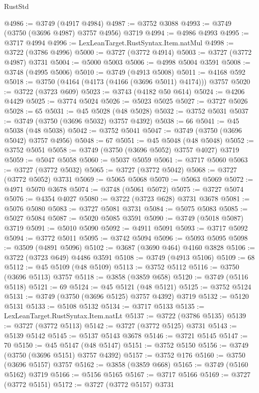 \begin{lexlean}{RustStd}
\begin{coremodule}
@4986 := @3749 (@4917 @4984)
@4987 := @3752 @3088
@4993 := @3749 (@3750 (@3696 @4987) @3757 @4956) @3719
@4994 := @4986 @4993
@4995 := @3717 @4994
@4996 := LexLeanTarget.RustSyntax.Item.natMul
@4998 := @3722 (@3786 @4996)
@5000 := @3727 (@3772 @4914)
@5003 := @3727 (@3772 @4987) @3731
@5004 := @5000 @5003
@5006 := @4998 @5004 @3591
@5008 := @3748 (@4995 @5006)
@5010 := @3749 (@4913 @5008)
@5011 := @4168 @592
@5018 := @3750 (@4164 (@4173 (@4166 (@3696 @5011) @4174))) @3757
@5020 := @3722 (@3723 @609)
@5023 := @3743 (@4182 @50 @614)
@5024 := @4206 @4429
@5025 := @3774 @5024
@5026 := @5023 @5025
@5027 := @3727 @5026
@5028 := 65
@5031 := @45 @5028 (@48 @5028)
@5032 := @3752 @5031
@5037 := @3749 (@3750 (@3696 @5032) @3757 @4392)
@5038 := 66
@5041 := @45 @5038 (@48 @5038)
@5042 := @3752 @5041
@5047 := @3749 (@3750 (@3696 @5042) @3757 @4956)
@5048 := 67
@5051 := @45 @5048 (@48 @5048)
@5052 := @3752 @5051
@5058 := @3749 (@3750 (@3696 @5052) @3757 @4027) @3719
@5059 := @5047 @5058
@5060 := @5037 @5059
@5061 := @3717 @5060
@5063 := @3727 (@3772 @5032)
@5065 := @3727 (@3772 @5042)
@5068 := @3727 (@3772 @5052) @3731
@5069 := @5065 @5068
@5070 := @5063 @5069
@5072 := @4971 @5070 @3678
@5074 := @3748 (@5061 @5072)
@5075 := @3727 @5074
@5076 := @4354 @4027
@5080 := @3722 (@3723 @628) @3731 @3678
@5081 := @5076 @5080
@5083 := @3727 @5081 @3731
@5084 := @5075 @5083
@5085 := @5027 @5084
@5087 := @5020 @5085 @3591
@5090 := @3749 (@5018 @5087) @3719
@5091 := @5010 @5090
@5092 := @4911 @5091
@5093 := @3717 @5092
@5094 := @3772 @5011
@5095 := @3742 @5094
@5096 := @5093 @5095
@5098 := @3509 (@4891 @5096)
@5102 := @3687 (@3690 @464) @4160 @3828
@5106 := @3722 (@3723 @649) @4486 @3591
@5108 := @3749 (@4913 @5106)
@5109 := 68
@5112 := @45 @5109 (@48 @5109)
@5113 := @3752 @5112
@5116 := @3750 (@3696 @5113) @3757
@5118 := @3858 (@3859 @658)
@5120 := @3749 (@5116 @5118)
@5121 := 69
@5124 := @45 @5121 (@48 @5121)
@5125 := @3752 @5124
@5131 := @3749 (@3750 (@3696 @5125) @3757 @4392) @3719
@5132 := @5120 @5131
@5133 := @5108 @5132
@5134 := @3717 @5133
@5135 := LexLeanTarget.RustSyntax.Item.natLt
@5137 := @3722 (@3786 @5135)
@5139 := @3727 (@3772 @5113)
@5142 := @3727 (@3772 @5125) @3731
@5143 := @5139 @5142
@5145 := @5137 @5143 @3678
@5146 := @3721 @5145
@5147 := 70
@5150 := @45 @5147 (@48 @5147)
@5151 := @3752 @5150
@5156 := @3749 (@3750 (@3696 @5151) @3757 @4392)
@5157 := @3752 @176
@5160 := @3750 (@3696 @5157) @3757
@5162 := @3858 (@3859 @668)
@5165 := @3749 (@5160 @5162) @3719
@5166 := @5156 @5165
@5167 := @3717 @5166
@5169 := @3727 (@3772 @5151)
@5172 := @3727 (@3772 @5157) @3731

\end{coremodule}
\end{lexlean}
